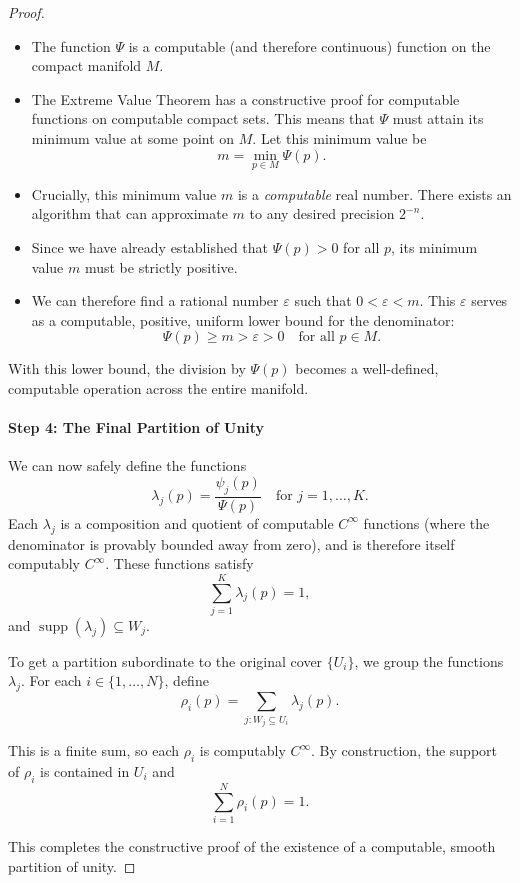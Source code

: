 \documentclass[12pt, a4paper]{article}
\begin{document}
\begin{proof}
\begin{itemize}
    \item The function $\Psi$ is a computable (and therefore continuous) function on the compact manifold $M$.
    \item The Extreme Value Theorem has a constructive proof for computable functions on computable compact sets. This means that $\Psi$ must attain its minimum value at some point on $M$. Let this minimum value be 
    \[
    m = \min_{p \in M} \Psi(p).
    \]
    \item Crucially, this minimum value $m$ is a \emph{computable} real number. There exists an algorithm that can approximate $m$ to any desired precision $2^{-n}$.
    \item Since we have already established that $\Psi(p) > 0$ for all $p$, its minimum value $m$ must be strictly positive.
    \item We can therefore find a rational number $\varepsilon$ such that $0 < \varepsilon < m$. This $\varepsilon$ serves as a computable, positive, uniform lower bound for the denominator:
    \[
    \Psi(p) \geq m > \varepsilon > 0 \quad \text{for all } p \in M.
    \]
\end{itemize}

With this lower bound, the division by $\Psi(p)$ becomes a well-defined, computable operation across the entire manifold.

\paragraph{Step 4: The Final Partition of Unity}

We can now safely define the functions
\[
\lambda_j(p) = \frac{\psi_j(p)}{\Psi(p)} \quad \text{for } j=1, \ldots, K.
\]
Each $\lambda_j$ is a composition and quotient of computable $C^\infty$ functions (where the denominator is provably bounded away from zero), and is therefore itself computably $C^\infty$. These functions satisfy 
\[
\sum_{j=1}^K \lambda_j(p) = 1,
\]
and $\operatorname{supp}(\lambda_j) \subseteq W_j$.

To get a partition subordinate to the original cover $\{ U_i \}$, we group the functions $\lambda_j$. For each $i \in \{1, \ldots, N\}$, define
\[
\rho_i(p) = \sum_{j: W_j \subseteq U_i} \lambda_j(p).
\]

This is a finite sum, so each $\rho_i$ is computably $C^\infty$. By construction, the support of $\rho_i$ is contained in $U_i$ and
\[
\sum_{i=1}^N \rho_i(p) = 1.
\]

This completes the constructive proof of the existence of a computable, smooth partition of unity.
\end{proof}
\end{document}
